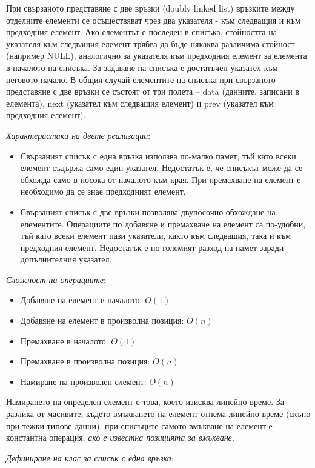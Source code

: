 \documentclass{article}
\renewcommand{\\}{\newline}
\begin{document}
При свързаното представяне с две връзки (doubly linked list) връзките между отделните елементи се осъществяват чрез два указателя - към следващия и към предходния елемент. Ако елементът е последен в списъка, стойността на указателя към следващия елемент трябва да бъде някаква различима стойност (например NULL), аналогично за указателя към предходния елемент за елемента в началото на списъка. За задаване на списъка е достатъчен указател към неговото начало. В общия случай елементите на списъка при свързаното представяне с две връзки се състоят от три полета – data (данните, записани в елемента), next (указател към следващия елемент) и prev (указател към предходния елемент).

\textit{Характеристики на двете реализации}: 
\begin{itemize}
    \item Свързаният списък с една връзка използва по-малко памет, тъй като всеки елемент съдържа само един указател. Недостатък е, че списъкът може да се обхожда само в посока от началото към края. При премахване на елемент е необходимо да се знае предходният елемент.
    \item Свързаният списък с две връзки позволява двупосочно обхождане на елементите. Операциите по добавяне и премахване на елемент са по-удобни, тъй като всеки елемент пази указатели, както към следващия, така и към предходния елемент. Недостатък е по-големият разход на памет заради допълнителния указател.
\end{itemize}

\textit{Сложност на операциите}:
\begin{itemize}
    \item Добавяне на елемент в началото: \(O(1)\) 
    \item Добавяне на елемент в произволна позиция: \(O(n)\)  
    \item Премахване в началото: \(O(1)\) 
    \item Премахване в произволна позиция: \(O(n)\) 
    \item Намиране на произволен елемент: \(O(n)\)  
\end{itemize}

Намирането на определен елемент е това, което изисква линейно време. За разлика от масивите, където вмъкването на елемент отнема линейно време (скъпо при тежки типове данни), при списъците самото вмъкване на елемент е константна операция, \textit{ако е известна позицията за вмъкване.}

\textit{Дефиниране на клас за списък с една връзка}:
\end{document}
